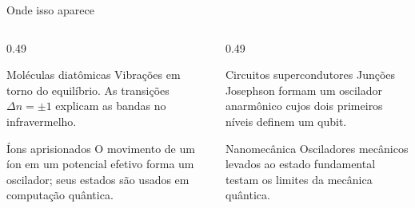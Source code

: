 \begin{frame}{Onde isso aparece}
  \begin{columns}[T,onlytextwidth]
    \begin{column}{0.49\textwidth}
      \begin{destaque}{Moléculas diatômicas}
        Vibrações em torno do equilíbrio. As transições
        $\Delta n = \pm 1$ explicam as bandas no infravermelho.
      \end{destaque}
      \begin{destaque}[fisicaamber]{Íons aprisionados}
        O movimento de um íon em um potencial efetivo forma um
        oscilador; seus estados são usados em computação quântica.
      \end{destaque}
    \end{column}
    \begin{column}{0.49\textwidth}
      \begin{destaque}[fisicaviolet]{Circuitos supercondutores}
        Junções Josephson formam um oscilador anarmônico cujos dois
        primeiros níveis definem um qubit.
      \end{destaque}
      \begin{destaque}[fisicagreen]{Nanomecânica}
        Osciladores mecânicos levados ao estado fundamental testam
        os limites da mecânica quântica.
      \end{destaque}
    \end{column}
  \end{columns}
\end{frame}
